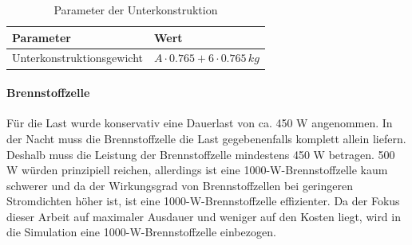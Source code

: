 \begin{table}[h]
\centering
\begin{tabular}{|l|l|}
\hline
\textbf{Parameter} & \textbf{Wert} \\ \hline
Unterkonstruktionsgewicht & $A \cdot 0.765 + 6 \cdot 0.765\, kg $ \\ \hline
\end{tabular}
\caption{Parameter der Unterkonstruktion \cite{Unterkonstruktion}}
\end{table}

\paragraph{Brennstoffzelle}
Für die Last wurde konservativ eine Dauerlast von ca. 450 W angenommen. In der Nacht muss die Brennstoffzelle die Last gegebenenfalls komplett allein liefern. Deshalb muss die Leistung der Brennstoffzelle mindestens 450 W betragen. 500 W würden prinzipiell reichen, allerdings ist eine 1000-W-Brennstoffzelle kaum schwerer und da der Wirkungsgrad von Brennstoffzellen bei geringeren Stromdichten höher ist, ist eine 1000-W-Brennstoffzelle effizienter. Da der Fokus dieser Arbeit auf maximaler Ausdauer und weniger auf den Kosten liegt, wird in die Simulation eine 1000-W-Brennstoffzelle einbezogen. \\

